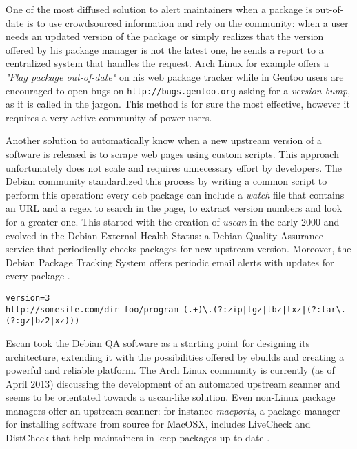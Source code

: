 One of the most diffused solution to alert maintainers when a package is out-of-date is to use crowdsourced information and rely on the community: when a user needs an updated version of the package or simply realizes that the version offered by his package manager is not the latest one, he sends a report to a centralized system that handles the request. Arch Linux for example offers a \emph{"Flag package out-of-date"} on his web package tracker \cite{arch_flaghelp} while in Gentoo users are encouraged to open bugs on \texttt{http://bugs.gentoo.org} asking for a \emph{version bump}, as it is called in the jargon. This method is for sure the most effective, however it requires a very active community of power users.

Another solution to automatically know when a new upstream version of a software is released is to scrape web pages using custom scripts. This approach unfortunately does not scale and requires unnecessary effort by developers.
The Debian community standardized this process by writing a common script to perform this operation: every deb package can include a \emph{watch} file that contains an URL and a regex to search in the page, to extract version numbers and look for a greater one.
This started with the creation of \emph{uscan} in the early 2000 and evolved in the Debian External Health Status: a Debian Quality Assurance service that periodically checks packages for new upstream version. Moreover, the Debian Package Tracking System offers periodic email alerts with updates for every package \cite{debian_qa}.

\vspace{0.5cm}
\lstset{caption=Example of a watch file, label=watch file, numbers=left, stepnumber=1, frame=single, breaklines=true}
\begin{lstlisting}
version=3
http://somesite.com/dir foo/program-(.+)\.(?:zip|tgz|tbz|txz|(?:tar\.(?:gz|bz2|xz)))
\end{lstlisting}
\vspace{0.5cm}

Escan took the Debian QA software as a starting point for designing its architecture, extending it with the possibilities offered by ebuilds and creating a powerful and reliable platform.
The Arch Linux community is currently (as of April 2013) discussing the development of an automated upstream scanner \cite{arch_scanner} and seems to be orientated towards a uscan-like solution.
Even non-Linux package managers offer an upstream scanner: for instance \emph{macports}, a package manager for installing software from source for MacOSX, includes LiveCheck and DistCheck that help maintainers in keep packages up-to-date \cite{macports_livecheck}.